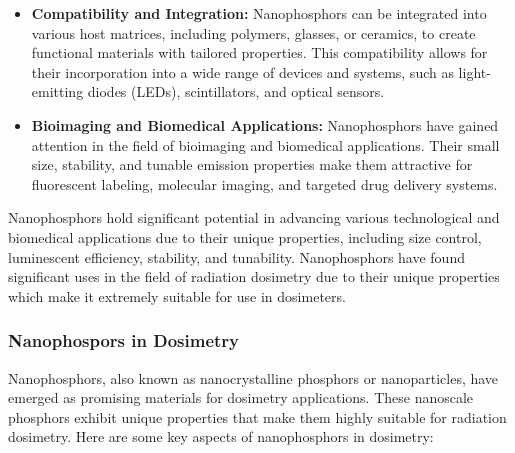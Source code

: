\documentclass[../introduction.tex]{subfiles}
\begin{document}
\begin{itemize}
        \item \textbf{Compatibility and Integration: } Nanophosphors can be integrated into various host 
        matrices, including polymers, glasses, or ceramics, to create functional materials with tailored 
        properties. This compatibility allows for their incorporation into a wide range of devices and 
        systems, such as light-emitting diodes (LEDs), scintillators, and optical sensors.

        \item \textbf{Bioimaging and Biomedical Applications: } Nanophosphors have gained attention in the 
        field of bioimaging and biomedical applications. Their small size, stability, and tunable emission 
        properties make them attractive for fluorescent labeling, molecular imaging, and targeted drug 
        delivery systems.
    \end{itemize}

    Nanophosphors hold significant potential in advancing various technological and biomedical applications 
    due to their unique properties, including size control, luminescent efficiency, stability, and tunability.
    Nanophosphors have found significant uses in the field of radiation dosimetry due to their unique 
    properties which make it extremely suitable for use in dosimeters.
    
    \subsubsection*{\large Nanophospors in Dosimetry}
        Nanophosphors, also known as nanocrystalline phosphors or nanoparticles, have emerged as promising 
        materials for dosimetry applications. These nanoscale phosphors exhibit unique properties that make 
        them highly suitable for radiation dosimetry. Here are some key aspects of nanophosphors in dosimetry:
\end{document}

